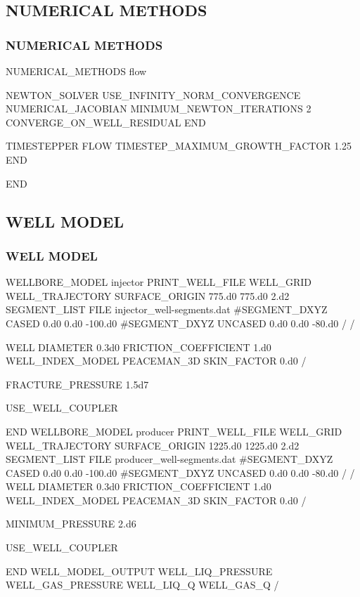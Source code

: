 \documentclass{beamer}
\newcommand\bluecomment[1]{{{\color{blue} #1}}}
\begin{document}
\subsection{NUMERICAL METHODS}
\begin{frame}[fragile]\frametitle{NUMERICAL METHODS}
\begin{semiverbatim}
NUMERICAL_METHODS flow

  NEWTON_SOLVER
    USE_INFINITY_NORM_CONVERGENCE
    NUMERICAL_JACOBIAN
    MINIMUM_NEWTON_ITERATIONS 2
    CONVERGE_ON_WELL_RESIDUAL
  END

  TIMESTEPPER FLOW
    TIMESTEP_MAXIMUM_GROWTH_FACTOR 1.25
  END

END

\end{semiverbatim}
\end{frame}

\subsection{WELL MODEL}
\begin{frame}\frametitle{WELL MODEL}
\begin{semiverbatim}
WELLBORE_MODEL injector
  PRINT_WELL_FILE
  WELL_GRID
    WELL_TRAJECTORY
      SURFACE_ORIGIN 775.d0 775.d0 2.d2
      SEGMENT_LIST FILE injector_well-segments.dat
      \bluecomment{#SEGMENT_DXYZ CASED 0.d0 0.d0 -100.d0}
      \bluecomment{#SEGMENT_DXYZ UNCASED 0.d0 0.d0 -80.d0}
    /
  /

\newpage
  WELL
    DIAMETER 0.3d0
    FRICTION_COEFFICIENT 1.d0
    WELL_INDEX_MODEL PEACEMAN_3D
    SKIN_FACTOR 0.d0
  /

  FRACTURE_PRESSURE 1.5d7

  USE_WELL_COUPLER

END
\newpage
WELLBORE_MODEL producer
  PRINT_WELL_FILE
  WELL_GRID
    WELL_TRAJECTORY
      SURFACE_ORIGIN 1225.d0 1225.d0 2.d2
      SEGMENT_LIST FILE producer_well-segments.dat
      \bluecomment{#SEGMENT_DXYZ CASED 0.d0 0.d0 -100.d0}
      \bluecomment{#SEGMENT_DXYZ UNCASED 0.d0 0.d0 -80.d0}
    /
  /
\newpage
  WELL
    DIAMETER 0.3d0
    FRICTION_COEFFICIENT 1.d0
    WELL_INDEX_MODEL PEACEMAN_3D
    SKIN_FACTOR 0.d0
  /

  MINIMUM_PRESSURE 2.d6

  USE_WELL_COUPLER

END
\newpage
WELL_MODEL_OUTPUT
  WELL_LIQ_PRESSURE
  WELL_GAS_PRESSURE
  WELL_LIQ_Q
  WELL_GAS_Q
/

\end{semiverbatim}
\end{frame}
\end{document}
